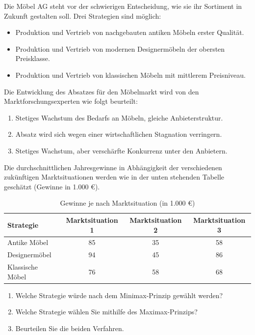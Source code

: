 Die Möbel AG steht vor der schwierigen Entscheidung, wie sie ihr Sortiment in Zukunft gestalten soll. Drei Strategien sind möglich:

\begin{itemize}
    \item Produktion und Vertrieb von nachgebauten antiken Möbeln erster Qualität.
    \item Produktion und Vertrieb von modernen Designermöbeln der obersten Preisklasse.
    \item Produktion und Vertrieb von klassischen Möbeln mit mittlerem Preisniveau.
\end{itemize}

Die Entwicklung des Absatzes für den Möbelmarkt wird von den Marktforschungsexperten wie folgt beurteilt:
\begin{enumerate}
    \item Stetiges Wachstum des Bedarfs an Möbeln, gleiche Anbieterstruktur.
    \item Absatz wird sich wegen einer wirtschaftlichen Stagnation verringern.
    \item Stetiges Wachstum, aber verschärfte Konkurrenz unter den Anbietern.
\end{enumerate}

Die durchschnittlichen Jahresgewinne in Abhängigkeit der verschiedenen zukünftigen Marktsituationen werden wie in der unten stehenden Tabelle geschätzt (Gewinne in 1.000 €).

\begin{table}[h!]
    \centering
    \begin{tabular}{|l|c|c|c|}
        \hline
        \textbf{Strategie} & \textbf{Marktsituation 1} & \textbf{Marktsituation 2} & \textbf{Marktsituation 3} \\
        \hline
        Antike Möbel & 85 & 35 & 58 \\
        \hline
        Designermöbel & 94 & 45 & 86 \\
        \hline
        Klassische Möbel & 76 & 58 & 68 \\
        \hline
    \end{tabular}
    \caption{Gewinne je nach Marktsituation (in 1.000 €)}
    \label{tab:moebel_gewinn}
\end{table}

\begin{enumerate}[label=(\alph*)]
    \item Welche Strategie würde nach dem Minimax-Prinzip gewählt werden?
    \item Welche Strategie wählen Sie mithilfe des Maximax-Prinzips?
    \item Beurteilen Sie die beiden Verfahren.
\end{enumerate}

